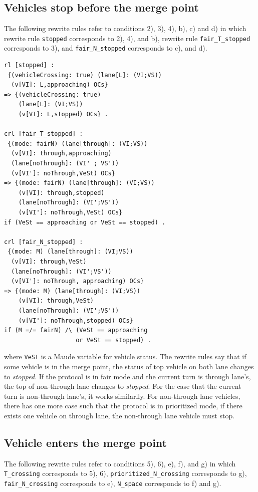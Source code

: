\documentclass[10pt, conference, compsocconf]{IEEEtran}
\begin{document}
\subsection{Vehicles stop before the merge point}
The following rewrite rules refer to conditions 2), 3), 4), b), c) and d) in which 
rewrite rule \verb!stopped! corresponds to 2), 4), and b), rewrite rule 
\verb!fair_T_stopped! corresponds to 3), and \verb!fair_N_stopped! corresponds
to c), and d).
\begin{small}
  \begin{verbatim}
rl [stopped] : 
 {(vehicleCrossing: true) (lane[L]: (VI;VS)) 
  (v[VI]: L,approaching) OCs} 
=> {(vehicleCrossing: true) 
    (lane[L]: (VI;VS)) 
    (v[VI]: L,stopped) OCs} .

crl [fair_T_stopped] : 
 {(mode: fairN) (lane[through]: (VI;VS)) 
  (v[VI]: through,approaching) 
  (lane[noThrough]: (VI' ; VS')) 
  (v[VI']: noThrough,VeSt) OCs} 
=> {(mode: fairN) (lane[through]: (VI;VS)) 
    (v[VI]: through,stopped)
    (lane[noThrough]: (VI';VS')) 
    (v[VI']: noThrough,VeSt) OCs} 
if (VeSt == approaching or VeSt == stopped) .

crl [fair_N_stopped] : 
 {(mode: M) (lane[through]: (VI;VS)) 
  (v[VI]: through,VeSt) 
  (lane[noThrough]: (VI';VS')) 
  (v[VI']: noThrough, approaching) OCs} 
=> {(mode: M) (lane[through]: (VI;VS)) 
    (v[VI]: through,VeSt)
    (lane[noThrough]: (VI';VS')) 
    (v[VI']: noThrough,stopped) OCs} 
if (M =/= fairN) /\ (VeSt == approaching 
                    or VeSt == stopped) .    
  \end{verbatim}
\end{small}

\noindent where \verb!VeSt! is a Maude variable for vehicle status.
The rewrite rules say that if some vehicle is in the merge point,
the status of top vehicle on both lane changes to \textit{stopped}.
If the protocol is in fair mode and the current turn is through lane's,
the top of non-through lane changes to \textit{stopped}. For the case 
that the current turn is non-through lane's, it works similarlly.
For non-through lane vehicles, there has one more case such that the protocol
is in prioritized mode, if there exists one vehicle on through lane, 
the non-through lane vehicle must stop.

\subsection{Vehicle enters the merge point}
The following rewrite rules refer to conditions 5), 6), e), f), and g)
in which \verb!T_crossing! corresponds to 5), 6), \verb!prioritized_N_crossing!
corresponds to g), \verb!fair_N_crossing! corresponds to e), \verb!N_space! 
corresponds to f) and g).
\end{document}
